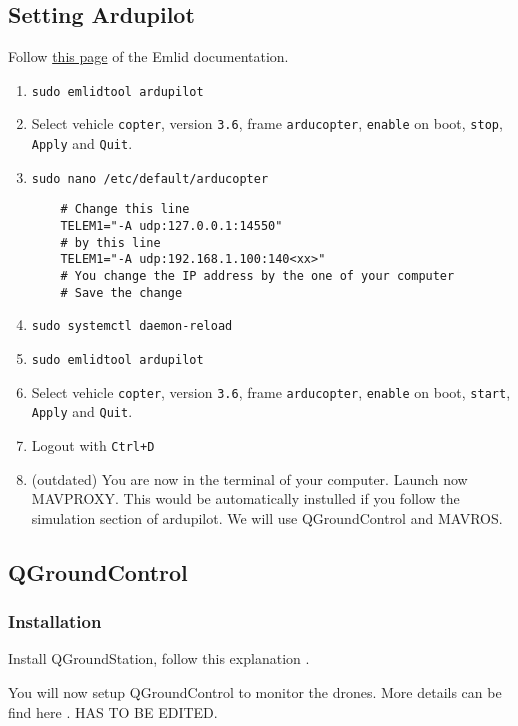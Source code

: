 \subsection{Setting Ardupilot}
Follow \href{https://docs.emlid.com/navio2/common/ardupilot/installation-and-running/}{this page} of the Emlid documentation.

\begin{enumerate}
    \item \texttt{sudo emlidtool ardupilot}
    \item Select vehicle \texttt{copter}, version \texttt{3.6}, frame \texttt{arducopter}, \texttt{enable} on boot, \texttt{stop}, \texttt{Apply} and \texttt{Quit}.
    \item \texttt{sudo nano /etc/default/arducopter}


          \begin{verbatim}
    # Change this line
    TELEM1="-A udp:127.0.0.1:14550"
    # by this line
    TELEM1="-A udp:192.168.1.100:140<xx>"
    # You change the IP address by the one of your computer
    # Save the change
                \end{verbatim}


    \item \texttt{sudo systemctl daemon-reload}
    \item \texttt{sudo emlidtool ardupilot}
    \item Select vehicle \texttt{copter}, version \texttt{3.6}, frame \texttt{arducopter}, \texttt{enable} on boot, \texttt{start}, \texttt{Apply} and \texttt{Quit}.
    \item Logout with \texttt{Ctrl+D}
    \item (outdated) You are now in the terminal of your computer. Launch now MAVPROXY. This would be automatically instulled if you follow the simulation section of ardupilot. We will use QGroundControl and MAVROS.
\end{enumerate}

\subsection{QGroundControl}
\subsubsection{Installation}
Install QGroundStation, follow this explanation \cite{qgc_install}.


You will now setup QGroundControl to monitor the drones. More details can be find here \cite{qgc_setup}.{ \color{red}HAS TO BE EDITED.}

